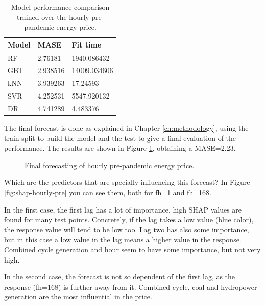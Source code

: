 \begin{table}[H]
\centering
\begin{tabular}{@{}l|l|l@{}}
\toprule
Model & MASE     & Fit time     \\ \midrule
RF    & 2.76181  & 1940.086432  \\
GBT   & 2.938516 & 14009.034606 \\
kNN   & 3.939263 & 17.24593     \\
SVR   & 4.252531 & 5547.920132  \\
DR    & 4.741289 & 4.483376     \\ \bottomrule
\end{tabular}
\caption{Model performance comparison trained over the hourly pre-pandemic energy price.}
\label{tab:cv-hourly-prep}
\end{table}

The final forecast is done as explained in Chapter \ref{ch:methodology}, using the train split to build the model and the test to give a final evaluation of the performance. The results are shown in Figure \ref{fig:forecast-hourly-pre}, obtaining a MASE=2.23.

\begin{figure}[H]
\centering
    \caption{Final forecasting of hourly pre-pandemic energy price.}
    \label{fig:forecast-hourly-pre}
\end{figure}

Which are the predictors that are specially influencing this forecast? In Figure \ref{fig:shap-hourly-pre} you can see them, both for fh=1 and fh=168.

In the first case, the first lag has a lot of importance, high SHAP values are found for many test points. Concretely, if the lag takes a low value (blue color), the response value will tend to be low too. Lag two has also some importance, but in this case a low value in the lag means a higher value in the response. Combined cycle generation and hour seem to have some importance, but not very high.

In the second case, the forecast is not so dependent of the first lag, as the response (fh=168) is further away from it. Combined cycle, coal and hydropower generation are the most influential in the price.

